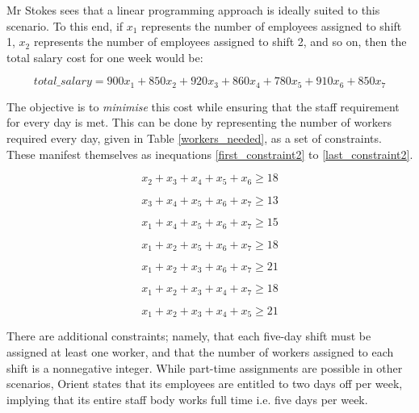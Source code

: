 \documentclass[11pt, a4paper]{article}
\begin{document}
    Mr Stokes sees that a linear programming approach is ideally suited to this scenario. To this end, if $x_{1}$ represents the number of employees assigned to shift 1, $x_{2}$ represents the number of employees assigned to shift 2, and so on, then the total salary cost for one week would be:

    \begin{equation}
        total\_salary = 900x_1 + 850x_2 + 920x_3 + 860x_4 + 780x_5 + 910x_6 + 850x_7
        \label{obj_func2}
    \end{equation}

    The objective is to \textit{minimise} this cost while ensuring that the staff requirement for every day is met. This can be done by representing the number of workers required every day, given in Table \ref{workers_needed}, as a set of constraints. These manifest themselves as inequations \ref{first_constraint2} to \ref{last_constraint2}.

    \begin{equation}
        x_2 + x_3 + x_4 + x_5 + x_6 \geq 18   
        \label{first_constraint2}     
    \end{equation}

    \begin{equation}
        x_3 + x_4 + x_5 + x_6 + x_7 \geq 13
    \end{equation}

    \begin{equation}
        x_1 + x_4 + x_5 + x_6 + x_7 \geq 15 
    \end{equation}

    \begin{equation}
        x_1 + x_2 + x_5 + x_6 + x_7 \geq 18
    \end{equation}

    \begin{equation}
        x_1 + x_2 + x_3 + x_6 + x_7 \geq 21
    \end{equation}

    \begin{equation}
        x_1 + x_2 + x_3 + x_4 + x_7 \geq 18
    \end{equation}

    \begin{equation}
        x_1 + x_2 + x_3 + x_4 + x_5 \geq 21
        \label{last_constraint2}
    \end{equation}

    There are additional constraints; namely, that each five-day shift must be assigned at least one worker, and that the number of workers assigned to each shift is a nonnegative integer. While part-time assignments are possible in other scenarios, Orient states that its employees are entitled to two days off per week, implying that its entire staff body works full time i.e. five days per week.
\end{document}
